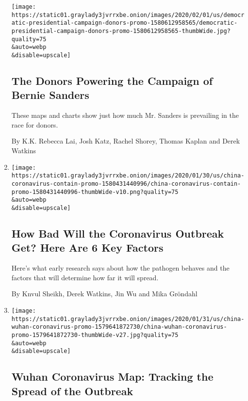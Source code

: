 \begin{enumerate}
  \texttt{[image: https://static01.graylady3jvrrxbe.onion/images/2020/02/01/us/democratic-presidential-campaign-donors-promo-1580612958565/democratic-presidential-campaign-donors-promo-1580612958565-thumbWide.jpg?quality=75\\\&auto=webp\\\&disable=upscale]}

  \hypertarget{the-donors-powering-the-campaign-of-bernie-sanders}{%
  \subsection{The Donors Powering the Campaign of Bernie
  Sanders}\label{the-donors-powering-the-campaign-of-bernie-sanders}}

  These maps and charts show just how much Mr. Sanders is prevailing in
  the race for donors.

  By K.K. Rebecca Lai, Josh Katz, Rachel Shorey, Thomas Kaplan and Derek
  Watkins
\item
  \href{/interactive/2020/world/asia/china-coronavirus-contain.html}{}

  \texttt{[image: https://static01.graylady3jvrrxbe.onion/images/2020/01/30/us/china-coronavirus-contain-promo-1580431440996/china-coronavirus-contain-promo-1580431440996-thumbWide-v10.png?quality=75\\\&auto=webp\\\&disable=upscale]}

  \hypertarget{how-bad-will-the-coronavirus-outbreak-get-here-are-6-key-factors}{%
  \subsection{How Bad Will the Coronavirus Outbreak Get? Here Are 6 Key
  Factors}\label{how-bad-will-the-coronavirus-outbreak-get-here-are-6-key-factors}}

  Here's what early research says about how the pathogen behaves and the
  factors that will determine how far it will spread.

  By Knvul Sheikh, Derek Watkins, Jin Wu and Mika Gröndahl
\item
  \href{/interactive/2020/01/21/world/asia/china-coronavirus-maps.html}{}

  \texttt{[image: https://static01.graylady3jvrrxbe.onion/images/2020/01/31/us/china-wuhan-coronavirus-promo-1579641872730/china-wuhan-coronavirus-promo-1579641872730-thumbWide-v27.jpg?quality=75\\\&auto=webp\\\&disable=upscale]}

  \hypertarget{wuhan-coronavirus-map-tracking-the-spread-of-the-outbreak}{%
  \subsection{Wuhan Coronavirus Map: Tracking the Spread of the
  Outbreak}\label{wuhan-coronavirus-map-tracking-the-spread-of-the-outbreak}}


\end{enumerate}
